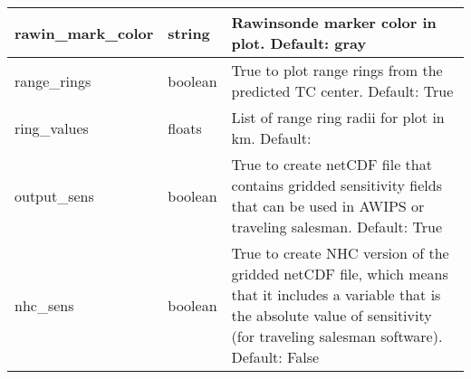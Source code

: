 \documentclass[psfig,12pt]{article}
\begin{document}
\begin{table}[H]
\begin{center}
\begin{tabular}{|p{1.60in}|p{0.5in}|p{4.15in}|}
rawin\_mark\_color & string & Rawinsonde marker color in plot.  Default: gray \\ \hline
range\_rings & boolean & True to plot range rings from the predicted TC center.  Default: True \\ \hline
ring\_values & floats & List of range ring radii for plot in km.  Default:  \\ \hline
output\_sens & boolean & True to create netCDF file that contains gridded sensitivity 
fields that can be used in AWIPS or traveling salesman.  Default:  True \\ \hline
nhc\_sens & boolean & True to create NHC version of the gridded netCDF file, which means that
it includes a variable that is the absolute value of sensitivity (for traveling salesman software).
Default:  False \\ \hline
\end{tabular}
\end{center}
\end{table}
\end{document}
